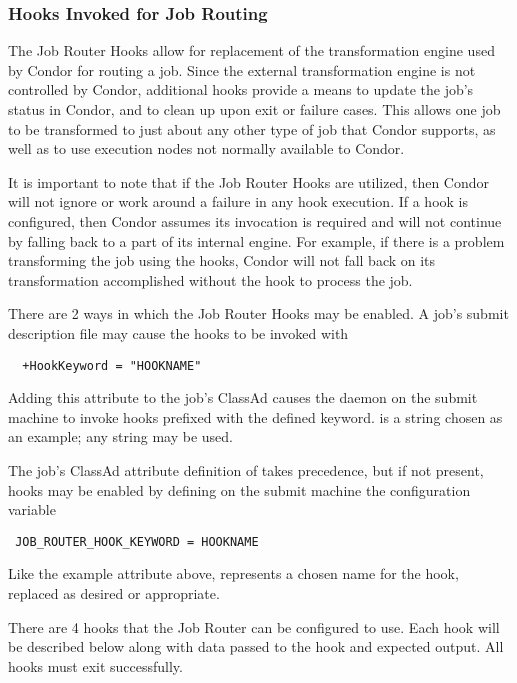 \subsubsection{\label{sec:job-hooks-JR}
Hooks Invoked for Job Routing}

The Job Router Hooks allow for replacement of the transformation engine used
by Condor for routing a job.
Since the external transformation engine is not controlled by Condor,
additional hooks provide a means to update the job's
status in Condor, and to clean up upon exit or failure cases.
This allows one job to be transformed to just about any other type of job
that Condor supports,
as well as to use execution nodes not normally available to Condor.

It is important to note that if the Job Router Hooks are utilized, 
then Condor will not ignore or work around a failure in any hook execution.
If a hook is configured,
then Condor assumes its invocation is required and will not
continue by falling back to a part of its internal engine.
For example,
if there is a problem transforming the job using the hooks,
Condor will not fall back on its transformation accomplished without the hook
to process the job.

There are 2 ways in which the Job Router Hooks may be enabled.
A job's submit description file may cause the hooks to be invoked with 
\footnotesize
\begin{verbatim}
  +HookKeyword = "HOOKNAME"
\end{verbatim}
\normalsize
Adding this attribute to the job's ClassAd causes the 
daemon on the submit machine to invoke hooks prefixed with the defined keyword.
 is a string chosen as an example; any string may be used.

The job's ClassAd attribute definition of  takes
precedence,
but if not present, hooks may be enabled by defining on the submit machine
the configuration variable 
\footnotesize
\begin{verbatim}
 JOB_ROUTER_HOOK_KEYWORD = HOOKNAME
\end{verbatim}
\normalsize
Like the example attribute above,
 represents a chosen name for the hook, 
replaced as desired or appropriate.

There are 4 hooks that the Job Router can be configured to use.
Each hook will be described below along with data passed 
to the hook and expected output.
All hooks must exit successfully.

